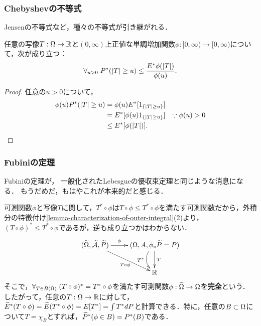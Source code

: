 \documentclass[uplatex,dvipdfmx]{jsreport}
\begin{document}
\subsubsection{Chebyshevの不等式}

\begin{tcolorbox}[colframe=ForestGreen, colback=ForestGreen!10!white,breakable,colbacktitle=ForestGreen!40!white,coltitle=black,fonttitle=\bfseries\sffamily,
title=]
    Jensenの不等式など，種々の不等式が引き継がれる．
\end{tcolorbox}

\begin{lemma}[外積分におけるChebyshevの不等式]
    任意の写像$T:\Omega\to\mathbb{R}$と$(0,\infty)$上正値な単調増加関数$\phi:[0,\infty)\to[0,\infty)$について，次が成り立つ：
    \[\forall_{u>0}\;P^*(\lvert T\rvert\ge u)\le\frac{E^*\phi(\lvert T\rvert)}{\phi(u)}.\]
\end{lemma}
\begin{proof}
    任意の$u>0$について，
    \begin{align*}
        \phi(u)P^*(\lvert T\rvert\ge u)&=\phi(u)E^*[1_{\left\{\lvert T\rvert\ge u\right\}}]\\
        &=E^*[\phi(u)1_{\left\{\lvert T\rvert\ge u\right\}}]&\because\phi(u)>0\\
        &\le E^*[\phi(\lvert T\rvert)].
    \end{align*}
\end{proof}

\subsubsection{Fubiniの定理}

\begin{tcolorbox}[colframe=ForestGreen, colback=ForestGreen!10!white,breakable,colbacktitle=ForestGreen!40!white,coltitle=black,fonttitle=\bfseries\sffamily,
title=]
    Fubiniの定理が，
    一般化されたLebesgueの優収束定理と同じような消息になる．
    もうだめだ，もはやこれが本来的だと感じる．
\end{tcolorbox}

\begin{definition}[perfect]
    可測関数$\phi$と写像$T$に関して，$T^*\circ\phi$は$T\circ\phi\le T^*\circ\phi$を満たす可測関数だから，外積分の特徴付け\ref{lemma-characterization-of-outer-integral}(2)より，
    $(T\circ\phi)^*\le T^*\circ\phi$であるが，逆も成り立つかはわからない．
    \[\xymatrix{
        (\wt{\Om},\wt{\A},\wt{P})\ar[r]^-\phi\ar[dr]_-{T\circ\phi}&(\Om,A,\phi_*\wt{P}=P)\ar[d]^-T\ar@/_1pc/[d]_-{T^*}\\
        &\R
    }\]
    そこで，$\forall_{T\in B(\Omega)}\;(T\circ\phi)^*=T^*\circ\phi$を満たす可測関数$\phi:\widetilde{\Omega}\to\Omega$を\textbf{完全}という．
    したがって，任意の$T:\Omega\to\mathbb{R}$に対して，
    $\widetilde{E}^*(T\circ\phi)=\widetilde{E}(T^*\circ\phi)=E[T^*]=\int T^*dP$と計算できる．特に，任意の$B\subset\Omega$について$T=\chi_B$とすれば，$\widetilde{P}^*(\phi\in B)=P^*(B)$である．
\end{definition}
\end{document}
